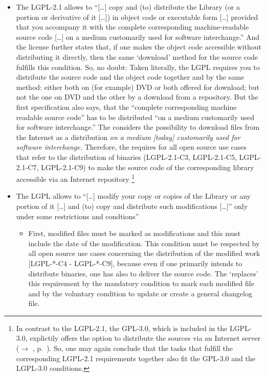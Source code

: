 \begin{itemize}
\item The LGPL-2.1 allows to \enquote{[\ldots] copy and (to) distribute the
  Library (or a portion or derivative of it [\ldots]) in object code or
  executable form [\ldots] provided that you accompany it with the complete
  corresponding machine-readable source code [\ldots] on a medium customarily
  used for software interchange.} And the license further states that, if one
  makes the object code accessible without distributing it directly, then the
  same `download' method for the source code fulfills this
  condition.  So, no doubt: Taken literally, the LGPL requires
  you to distribute the source code and the object code together and by the same
  method: either both on (for example) DVD or both offered for download; but not
  the one on DVD and the other by a download from a repository. But the first
  specification also says, that the \enquote{complete corresponding machine
  readable source code} has to be distributed \enquote{on a medium customarily
  used for software interchange.}  The \oslic{} considers the
  possibility to download files from the Internet as a distribution \emph{on a
  medium [today] customarily used for software interchange.} Therefore, the
  \oslic{} requires for all open source use cases that refer to the distribution
  of binaries (LGPL-2.1-C3, LGPL-2.1-C5, LGPL-2.1-C7, LGPL-2.1-C9) to make the
  source code of the corresponding library accessible via an Internet
  repository%
  \footnote{In contrast to the LGPL-2.1, the GPL-3.0, which is included in the
    LGPL-3.0, explictily offers the option to distribute the sources via an
    Internet server ($\rightarrow$ \oslic, p.\ \pageref{Gpl3CondCopyleft}). So,
    one may again conclude that the tasks that fulfill the corresponding
    LGPL-2.1 requirements together also fit the GPL-3.0 and the LGPL-3.0
    conditions.} 
  
\item The LGPL allows to \enquote{[\ldots] modify your copy or copies of the
  Library or any portion of it [\ldots] and (to) copy and distribute such
  modifications [\ldots]} only under some restrictions and
  condtions'' 
  \begin{itemize}
  \item First, modified files must be marked as modifications and this must
    include the date of the modification. This
    condition must be respected by all open source use cases concerning the
    distribution of the modified work [LGPL-*-C4 - LGPL-*-C9], because even if
    one primarily intends to distribute binaries, one has also to deliver the
    source code. The \oslic{} `replaces' this requirement by the mandatory
    condition to mark each modified file and by the voluntary condition to
    update or create a general changelog file.
    

\end{itemize}
\end{itemize}
